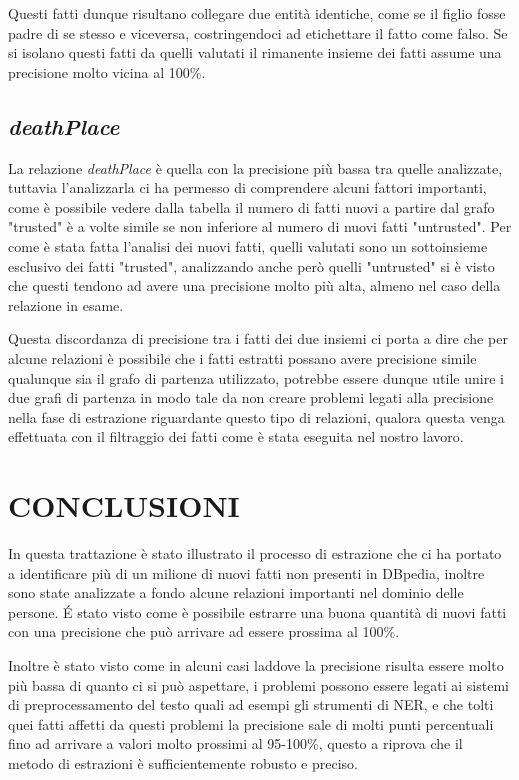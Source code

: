 \documentclass[10pt,a4paper,twocolumn]{article}
\begin{document}
Questi fatti dunque risultano collegare due entità identiche, come se il figlio fosse padre di se stesso e viceversa, costringendoci ad etichettare il fatto come falso. Se si isolano questi fatti da quelli valutati il rimanente insieme dei fatti assume una precisione molto vicina al 100\%.

\subsection{\textit{deathPlace}} \label{deathPlace}

La relazione \textit{deathPlace} è quella con la precisione più bassa tra quelle analizzate, tuttavia l'analizzarla ci ha permesso di comprendere alcuni fattori importanti, come è possibile vedere dalla tabella il numero di fatti nuovi a partire dal grafo "trusted" è a volte simile se non inferiore al numero di nuovi fatti "untrusted". Per come è stata fatta l'analisi dei nuovi fatti, quelli valutati sono un sottoinsieme esclusivo dei fatti "trusted", analizzando anche però quelli "untrusted" si è visto che questi tendono ad avere una precisione molto più alta, almeno nel caso della relazione in esame.

Questa discordanza di precisione tra i fatti dei due insiemi ci porta a dire che per alcune relazioni è possibile che i fatti estratti possano avere precisione simile qualunque sia il grafo di partenza utilizzato, potrebbe essere dunque utile unire i due grafi di partenza in modo tale da non creare problemi legati alla precisione nella fase di estrazione riguardante questo tipo di relazioni, qualora questa venga effettuata con il filtraggio dei fatti come è stata eseguita nel nostro lavoro.

\section{CONCLUSIONI}

In questa trattazione è stato illustrato il processo di estrazione che ci ha portato a identificare più di un milione di nuovi fatti non presenti in DBpedia, inoltre sono state analizzate a fondo alcune relazioni importanti nel dominio delle persone. \'E stato visto come è possibile estrarre una buona quantità di nuovi fatti con una precisione che può arrivare ad essere prossima al 100\%. 

Inoltre è stato visto come in alcuni casi laddove la precisione risulta essere molto più bassa di quanto ci si può aspettare, i problemi possono essere legati ai sistemi di preprocessamento del testo quali ad esempi gli strumenti di NER, e che tolti quei fatti affetti da questi problemi la precisione sale di molti punti percentuali fino ad arrivare a valori molto prossimi al 95-100\%, questo a riprova che il metodo di estrazioni è sufficientemente robusto e preciso.
\end{document}

